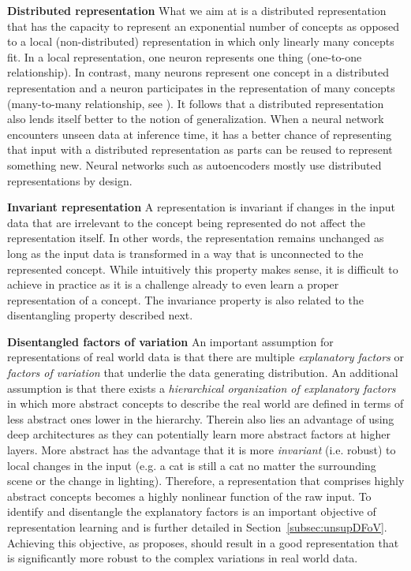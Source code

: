 \documentclass[a4paper,12pt]{report}
\begin{document}
\textbf{Distributed representation}
What we aim at is a distributed representation that has the capacity to represent an exponential number of concepts as opposed to a local (non-distributed) representation in which only linearly many concepts fit. In a local representation, one neuron represents one thing (one-to-one relationship). In contrast, many neurons represent one concept in a distributed representation and a neuron participates in the representation of many concepts (many-to-many relationship, see \cite{DistrRepHinton}). It follows that a distributed representation also lends itself better to the notion of generalization. When a neural network encounters unseen data at inference time, it has a better chance of representing that input with a distributed representation as parts can be reused to represent something new. Neural networks such as autoencoders mostly use distributed representations by design.

\textbf{Invariant representation}
A representation is invariant if changes in the input data that are irrelevant to the concept being represented do not affect the representation itself. In other words, the representation remains unchanged as long as the input data is transformed in a way that is unconnected to the represented concept. While intuitively this property makes sense, it is difficult to achieve in practice as it is a challenge already to even learn a proper representation of a concept. The invariance property is also related to the disentangling property described next.

\textbf{Disentangled factors of variation} An important assumption for representations of real world data is that there are multiple \textit{explanatory factors} or \textit{factors of variation} that underlie the data generating distribution. An additional assumption is that there exists a \textit{hierarchical organization of explanatory factors} in which more abstract concepts to describe the real world are defined in terms of less abstract ones lower in the hierarchy. Therein also lies an advantage of using deep architectures as they can potentially learn more abstract factors at higher layers. More abstract has the advantage that it is more \textit{invariant} (i.e. robust) to local changes in the input (e.g. a cat is still a cat no matter the surrounding scene or the change in lighting). Therefore, a representation that comprises highly abstract concepts becomes a highly nonlinear function of the raw input. To identify and disentangle the explanatory factors is an important objective of representation learning and is further detailed in Section~\ref{subsec:unsupDFoV}. Achieving this objective, as \cite{ReprLearning} proposes, should result in a good representation that is significantly more robust to the complex variations in real world data. 
\end{document}
